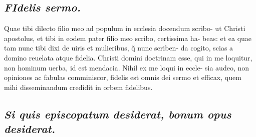 \documentclass{article}
\begin{document}
\begin{pages}
\subsection*{\textit{\huge\textbf{F}\normalsize Idelis sermo. }}\pstart Quae tibi dilecto filio meo ad populum in ecclesia docendum scribo- ut Christi apostolus, et tibi in eodem pater filio meo scribo, certissima ha- beas: et ea quae tam nunc tibi dixi de uiris et mulieribus, q̃ nunc scriben- da cogito, scias a domino reuelata atque  fidelia. Christi domini doctrinam esse, qui in me loquitur, non hominum uerba, id est mendacia. Nihil ex me loqui in eccle- sia audeo, non opiniones ac fabulas comminiscor, fidelis est omnis dei sermo et efficax, quem mihi disseminandum credidit in orbem fidelibus.  \pend
{}
{}
\subsection*{\textit{Si quis episcopatum desiderat, bonum opus desiderat. }}
\endnumbering
\end{pages}
\end{document}
